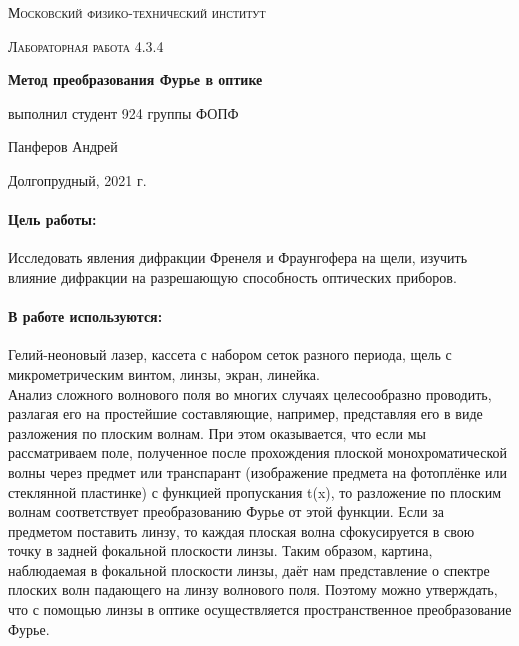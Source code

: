 \documentclass[a4paper, 12pt]{article}
\begin{document}
	
\begin{titlepage}
	\centering
	\vspace{5cm}
	{\scshape\LARGE Московский физико-технический институт \par}
	\vspace{4cm}
	{\scshape\Large Лабораторная работа 4.3.4 \par}
	\vspace{1cm}
	{\huge\bfseries Метод преобразования Фурье в оптике \par}
	\vspace{1cm}
	\vfill
\begin{flushright}
	{\large выполнил студент 924 группы ФОПФ}\par
	\vspace{0.3cm}
	{\LARGE Панферов Андрей}
\end{flushright}
	

	\vfill

	Долгопрудный, 2021 г.
\end{titlepage}

\paragraph*{Цель работы:} Исследовать явления дифракции Френеля и Фраунгофера на щели, изучить влияние дифракции на разрешающую способность оптических приборов.
\paragraph*{В работе используются:} Гелий-неоновый лазер, кассета с набором
сеток разного периода, щель с микрометрическим винтом, линзы,
экран, линейка.
$$$$
Анализ сложного волнового поля во многих случаях целесообразно проводить, разлагая его на простейшие составляющие, например, представляя его в виде разложения по плоским волнам. При этом оказывается, что если мы рассматриваем поле, полученное после прохождения плоской монохроматической волны через предмет или транспарант (изображение предмета на фотоплёнке или стеклянной пластинке) с функцией пропускания t(x), то разложение по плоским волнам соответствует преобразованию Фурье от этой функции. Если за предметом поставить линзу, то каждая плоская волна сфокусируется в свою точку в задней фокальной плоскости линзы. Таким образом, картина, наблюдаемая в фокальной плоскости линзы, даёт нам представление о спектре плоских волн падающего на линзу волнового поля. Поэтому можно утверждать, что с помощью линзы в оптике осуществляется пространственное преобразование Фурье.
\end{document}
